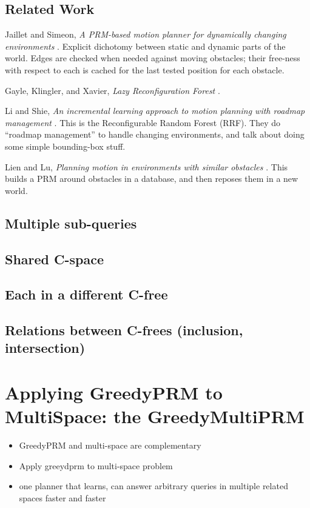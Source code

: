 \documentclass{article}
\begin{document}
\subsection{Related Work}

Jaillet and Simeon,
\emph{A PRM-based motion planner for dynamically changing environments}
\cite{jaillet2004dynamicprm}.
Explicit dichotomy between static and dynamic parts of the world.
Edges are checked when needed against moving obstacles;
their free-ness with respect to each is cached for the last tested position
for each obstacle.

Gayle, Klingler, and Xavier,
\emph{Lazy Reconfiguration Forest}
\cite{gayle2007lazyreconfigforest}.

Li and Shie,
\emph{An incremental learning approach to motion planning with
      roadmap management}
\cite{li2002incrementalprmmanagement}.
This is the Reconfigurable Random Forest (RRF).
They do ``roadmap management'' to handle changing environments,
and talk about doing some simple bounding-box stuff.

Lien and Lu,
\emph{Planning motion in environments with similar obstacles}
\cite{lien2009similarobstacles}.
This builds a PRM around obstacles in a database,
and then reposes them in a new world.

\subsection{Multiple sub-queries}

\subsection{Shared C-space}

\subsection{Each in a different C-free}

\subsection{Relations between C-frees (inclusion, intersection)}


\newpage
\section{Applying GreedyPRM to MultiSpace: the GreedyMultiPRM}

\begin{itemize}
\item GreedyPRM and multi-space are complementary
\item Apply greeydprm to multi-space problem
\item one planner that learns, can answer arbitrary queries
   in multiple related spaces faster and faster
\end{itemize}
\end{document}
